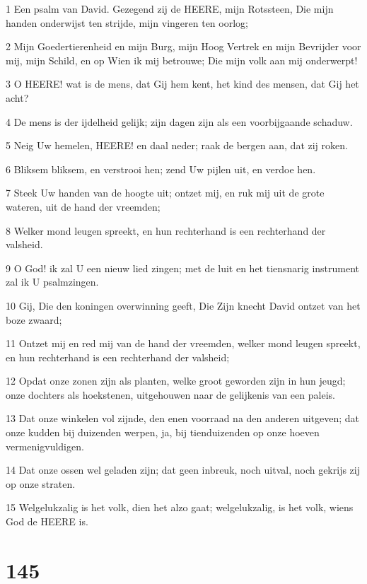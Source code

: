 \par 1 Een psalm van David. Gezegend zij de HEERE, mijn Rotssteen, Die mijn handen onderwijst ten strijde, mijn vingeren ten oorlog;
\par 2 Mijn Goedertierenheid en mijn Burg, mijn Hoog Vertrek en mijn Bevrijder voor mij, mijn Schild, en op Wien ik mij betrouwe; Die mijn volk aan mij onderwerpt!
\par 3 O HEERE! wat is de mens, dat Gij hem kent, het kind des mensen, dat Gij het acht?
\par 4 De mens is der ijdelheid gelijk; zijn dagen zijn als een voorbijgaande schaduw.
\par 5 Neig Uw hemelen, HEERE! en daal neder; raak de bergen aan, dat zij roken.
\par 6 Bliksem bliksem, en verstrooi hen; zend Uw pijlen uit, en verdoe hen.
\par 7 Steek Uw handen van de hoogte uit; ontzet mij, en ruk mij uit de grote wateren, uit de hand der vreemden;
\par 8 Welker mond leugen spreekt, en hun rechterhand is een rechterhand der valsheid.
\par 9 O God! ik zal U een nieuw lied zingen; met de luit en het tiensnarig instrument zal ik U psalmzingen.
\par 10 Gij, Die den koningen overwinning geeft, Die Zijn knecht David ontzet van het boze zwaard;
\par 11 Ontzet mij en red mij van de hand der vreemden, welker mond leugen spreekt, en hun rechterhand is een rechterhand der valsheid;
\par 12 Opdat onze zonen zijn als planten, welke groot geworden zijn in hun jeugd; onze dochters als hoekstenen, uitgehouwen naar de gelijkenis van een paleis.
\par 13 Dat onze winkelen vol zijnde, den enen voorraad na den anderen uitgeven; dat onze kudden bij duizenden werpen, ja, bij tienduizenden op onze hoeven vermenigvuldigen.
\par 14 Dat onze ossen wel geladen zijn; dat geen inbreuk, noch uitval, noch gekrijs zij op onze straten.
\par 15 Welgelukzalig is het volk, dien het alzo gaat; welgelukzalig, is het volk, wiens God de HEERE is.

\chapter{145}

